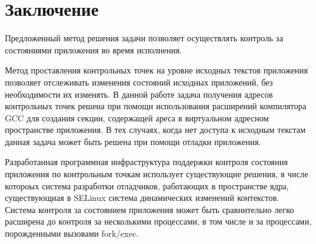
\bigskip
\section {Заключение} 

Предложенный метод решения задачи 
позволяет осуществлять контроль за 
состояниями приложения во время исполнения.

Метод проставления контрольных точек
на уровне исходных текстов приложения позволяет 
отслеживать изменения состояний исходных 
приложений, без необходимости их изменять. 
В данной работе задача получения 
адресов контрольных точек решена при помощи 
использования расширений компилятора GCC 
для создания секции, содержащей ареса в 
виртуальном адресном пространстве приложения.
В тех случаях, когда нет доступа к исходным 
текстам данная задача может быть решена при 
помощи отладки приложения. 

Разработанная программная инфраструктура 
поддержки контроля состояния приложения 
по контрольным точкам использует 
существующие решения, в числе котороых система 
разработки отладчиков, работающих в пространстве 
ядра, существующиая в SELinux система динамических 
изменений контекстов. Система контроля за 
состоянием приложения может быть сравнительно 
легко расширена до контроля за несколькими процессами, 
в том числе и за процессами, порожденными вызовами 
fork/exec. 
